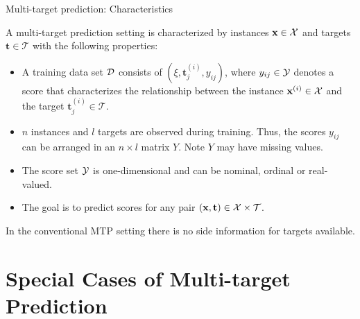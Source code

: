 \documentclass[11pt,compress,t,notes=noshow, xcolor=table]{beamer}
\newcommand{\Tspace}{\mathcal{T}}
\newcommand{\tv}{\mathbf{t}}
\newcommand{\tij}{\mathbf{t}^{(i)}_j}
\begin{document}
\begin{frame}{Multi-target prediction: Characteristics}

	\small
		A multi-target prediction setting is characterized by instances $\mathbf{x} \in \mathcal{X}$ and targets $\tv \in \Tspace$ with the following properties: 

		\begin{itemize} \small
	
			\item A training data set $\mathcal{D}$ consists of $(\xi,\tij,y_{ij})$, where $y_{ij} \in \mathcal{Y}$ denotes a score that characterizes the relationship between the instance $\mathbf{x}^{(i)} \in \mathcal{X}$ and the target $\tij \in \Tspace$.  
			
			\item $n$ instances and $l$ targets are observed during training. Thus, the scores $y_{ij}$ can be arranged in an $n \times l$ matrix $Y$. Note $Y$ may have missing values.
	
			\item The score set $\mathcal{Y}$ is one-dimensional and can be nominal, ordinal or real-valued.  
		
			\item The goal is to predict scores for any pair $(\xv,\tv) \in \Xspace \times \Tspace$.  
            \vspace{10pt}
		
		\end{itemize}
% 
%
In the conventional MTP setting there is no side information for targets available. 
%	
%
\end{frame}

\section{Special Cases of Multi-target Prediction}
\end{document}
